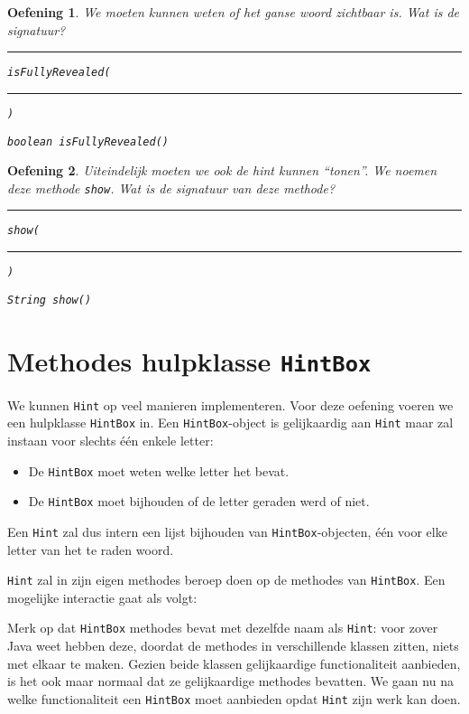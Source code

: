 \documentclass[a4paper,dutch]{article}
\newtheorem{exercise}{Oefening}[section]
\newcommand{\code}[2][]{
  
}
\begin{document}
\begin{exercise}
We moeten kunnen weten of het ganse woord zichtbaar is. Wat is de signatuur?
\begin{center}
  \rule{2cm}{.5pt} {\tt isFullyRevealed(}\rule{4cm}{.5pt}{\tt)}
\end{center}
\begin{solution}
\tt boolean isFullyRevealed()
\end{solution}
\end{exercise}

\begin{exercise}
Uiteindelijk moeten we ook de hint kunnen ``tonen''. We noemen deze methode {\tt show}.
Wat is de signatuur van deze methode?
\begin{center}
  \rule{2cm}{.5pt} {\tt show(}\rule{4cm}{.5pt}{\tt)}
\end{center}
\begin{solution}
\tt String show()
\end{solution}
\end{exercise}

\section{Methodes hulpklasse {\tt HintBox}}
We kunnen {\tt Hint} op veel manieren implementeren. Voor deze oefening
voeren we een hulpklasse {\tt HintBox} in. Een {\tt HintBox}-object is gelijkaardig aan {\tt Hint} maar zal instaan
voor slechts \'e\'en enkele letter:
\begin{itemize}
  \item De {\tt HintBox} moet weten welke letter het bevat.
  \item De {\tt HintBox} moet bijhouden of de letter geraden werd of niet.
\end{itemize}
Een {\tt Hint} zal dus intern een lijst bijhouden van {\tt HintBox}-objecten,
\'e\'en voor elke letter van het te raden woord. 
\begin{center}
\end{center}
{\tt Hint} zal in zijn eigen methodes
beroep doen op de methodes van {\tt HintBox}. Een mogelijke interactie gaat als volgt:
\code{hintbox-interaction.java}
Merk op dat {\tt HintBox} methodes bevat met dezelfde naam als {\tt Hint}:
voor zover Java weet hebben deze, doordat de methodes in verschillende klassen zitten,
niets met elkaar te maken. 
Gezien beide klassen gelijkaardige
functionaliteit aanbieden, is het ook maar normaal dat ze gelijkaardige methodes bevatten.
We gaan nu na welke functionaliteit een {\tt HintBox} moet aanbieden
opdat {\tt Hint} zijn werk kan doen.
\end{document}
